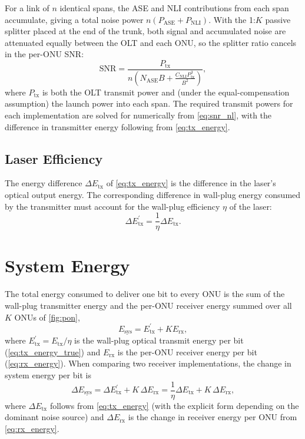 \documentclass[12pt,a4paper]{article}
\begin{document}
For a link of \(n\) identical spans, the ASE and NLI contributions from each span accumulate, giving a total noise power \(n(P_\mathrm{ASE} + P_\mathrm{NLI})\). With the 1:\(K\) passive splitter placed at the end of the trunk, both signal and accumulated noise are attenuated equally between the OLT and each ONU, so the splitter ratio cancels in the per-ONU SNR:
\begin{equation}
    \mathrm{SNR} = \frac{P_\mathrm{tx}}{n\left(N_\mathrm{ASE}B + \frac{C_\mathrm{NLI} P_\mathrm{tx}^3}{B^2}\right)},
    \label{eq:snr_nl}
\end{equation}
where \(P_\mathrm{tx}\) is both the OLT transmit power and (under the equal-compensation assumption) the launch power into each span. The required transmit powers for each implementation are solved for numerically from \cref{eq:snr_nl}, with the difference in transmitter energy following from \cref{eq:tx_energy}.

\subsection{Laser Efficiency}
The energy difference \(\Delta E_\mathrm{tx}\) of \cref{eq:tx_energy} is the difference in the laser's optical output energy. The corresponding difference in wall-plug energy consumed by the transmitter must account for the wall-plug efficiency \(\eta\) of the laser:
\begin{equation}
    \Delta E^{'}_\mathrm{tx} = \frac{1}{\eta} \Delta E_\mathrm{tx}.
    \label{eq:tx_energy_true}
\end{equation}

\section{System Energy}
The total energy consumed to deliver one bit to every ONU is the sum of the wall-plug transmitter energy and the per-ONU receiver energy summed over all \(K\) ONUs of \cref{fig:pon},
\begin{equation}
    E_\mathrm{sys} = E^{'}_\mathrm{tx} + K E_\mathrm{rx},
\end{equation}
where \(E^{'}_\mathrm{tx} = E_\mathrm{tx}/\eta\) is the wall-plug optical transmit energy per bit (\cref{eq:tx_energy_true}) and \(E_\mathrm{rx}\) is the per-ONU receiver energy per bit (\cref{eq:rx_energy}). When comparing two receiver implementations, the change in system energy per bit is
\begin{equation}
    \Delta E_\mathrm{sys} = \Delta E^{'}_\mathrm{tx} + K\,\Delta E_\mathrm{rx} = \frac{1}{\eta}\Delta E_\mathrm{tx} + K\,\Delta E_\mathrm{rx},
    \label{eq:sys_energy}
\end{equation}
where \(\Delta E_\mathrm{tx}\) follows from \cref{eq:tx_energy} (with the explicit form depending on the dominant noise source) and \(\Delta E_\mathrm{rx}\) is the change in receiver energy per ONU from \cref{eq:rx_energy}.

\printbibliography
\end{document}
